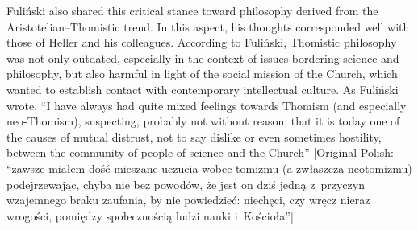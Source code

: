 Fuliński also shared this critical stance toward philosophy derived from the Aristotelian–Thomistic trend. In this aspect, his thoughts corresponded well with those of Heller and his colleagues. According to Fuliński, Thomistic philosophy was not only outdated, especially in the context of issues bordering science and philosophy, but also harmful in light of the social mission of the Church, which wanted to establish contact with contemporary intellectual culture. As Fuliński wrote, ``I have always had quite mixed feelings towards Thomism (and especially neo-Thomism), suspecting, probably not without reason, that it is today one of the causes of mutual distrust, not to say dislike or even sometimes hostility, between the community of people of science and the Church'' [Original Polish: ``zawsze miałem dość mieszane uczucia wobec tomizmu (a zwłaszcza neotomizmu) podejrzewając, chyba nie bez powodów, że jest on dziś jedną z~przyczyn wzajemnego braku zaufania, by nie powiedzieć: niechęci, czy wręcz nieraz wrogości, pomiędzy społecznością ludzi nauki i~Kościoła''] 
\parencite[][p.227]{fulinski_maszyna_1989}.%




